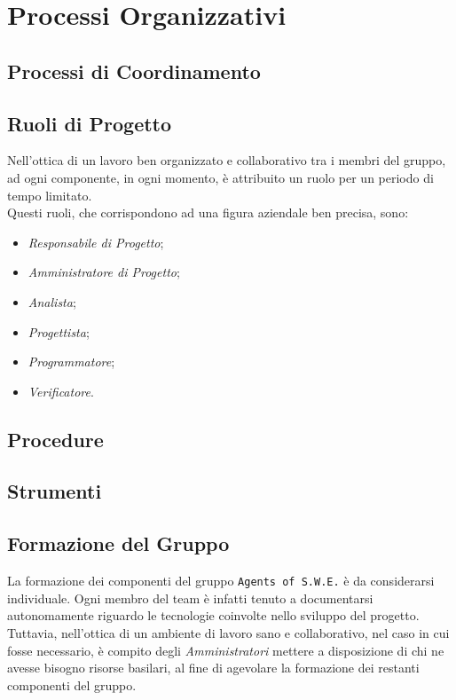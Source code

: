 \section{Processi Organizzativi}\label{ProcessiOrganizzativi}

\subsection{Processi di Coordinamento}\label{ProcessiOrganizzativi_ProcessiCoordinamento}


\subsection{Ruoli di Progetto}\label{ProcessiOrganizzativi_RuoliProgetto}
	Nell'ottica di un lavoro ben organizzato e collaborativo tra i membri del gruppo, ad ogni componente, in ogni 					momento, è attribuito un ruolo per un periodo di tempo limitato.\\
	Questi ruoli, che corrispondono ad una figura aziendale ben precisa, sono:
	\begin{itemize}
	\item \textit{Responsabile di Progetto};
	\item \textit{Amministratore di Progetto};
	\item \textit{Analista};
	\item \textit{Progettista};
	\item \textit{Programmatore};
	\item \textit{Verificatore}.
	\end{itemize}
	

\subsection{Procedure}\label{ProcessiOrganizzativi_Procedure}


\subsection{Strumenti}\label{ProcessiOrganizzativi_Strumenti}


\subsection{Formazione del Gruppo}\label{ProcessiOrganizzativi_FormazioneGruppo}
	La formazione dei componenti del gruppo \texttt{Agents of S.W.E.} è da considerarsi individuale. Ogni membro del 			team è infatti tenuto a documentarsi autonomamente riguardo le tecnologie coinvolte nello sviluppo del 								progetto\glossario. Tuttavia, nell'ottica di un ambiente di lavoro sano e collaborativo, nel caso in cui fosse 				necessario, è compito degli \textit{Amministratori} mettere a disposizione di chi ne avesse bisogno risorse 						basilari, al fine di	agevolare la formazione dei restanti componenti del gruppo.

